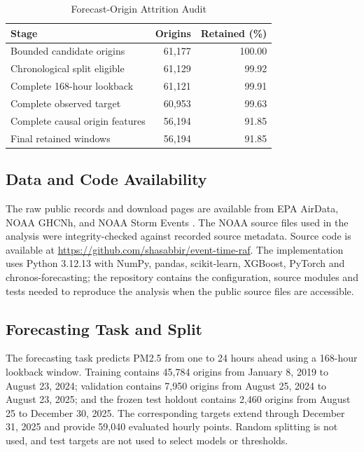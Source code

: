 \documentclass{ieeeaccess}
\begin{document}
\begin{table}[!t]
\centering
\caption{Forecast-Origin Attrition Audit}
\label{tab:window_attrition}
\begin{tabular}{lrr}
\toprule
Stage & Origins & Retained (\%) \\
\midrule
Bounded candidate origins & 61,177 & 100.00 \\
Chronological split eligible & 61,129 & 99.92 \\
Complete 168-hour lookback & 61,121 & 99.91 \\
Complete observed target & 60,953 & 99.63 \\
Complete causal origin features & 56,194 & 91.85 \\
Final retained windows & 56,194 & 91.85 \\
\bottomrule
\end{tabular}
\end{table}

\subsection{Data and Code Availability}
The raw public records and download pages are available from EPA AirData, NOAA GHCNh, and NOAA Storm Events \cite{epaairdata2026,noaaisd2026,noaastormevents2026}. The NOAA source files used in the analysis were integrity-checked against recorded source metadata. Source code is available at \url{https://github.com/shasabbir/event-time-raf}. The implementation uses Python 3.12.13 with NumPy, pandas, scikit-learn, XGBoost, PyTorch and chronos-forecasting; the repository contains the configuration, source modules and tests needed to reproduce the analysis when the public source files are accessible.

\subsection{Forecasting Task and Split}
The forecasting task predicts PM2.5 from one to 24 hours ahead using a 168-hour lookback window. Training contains 45,784 origins from January 8, 2019 to August 23, 2024; validation contains 7,950 origins from August 25, 2024 to August 23, 2025; and the frozen test holdout contains 2,460 origins from August 25 to December 30, 2025. The corresponding targets extend through December 31, 2025 and provide 59,040 evaluated hourly points. Random splitting is not used, and test targets are not used to select models or thresholds.
\end{document}
